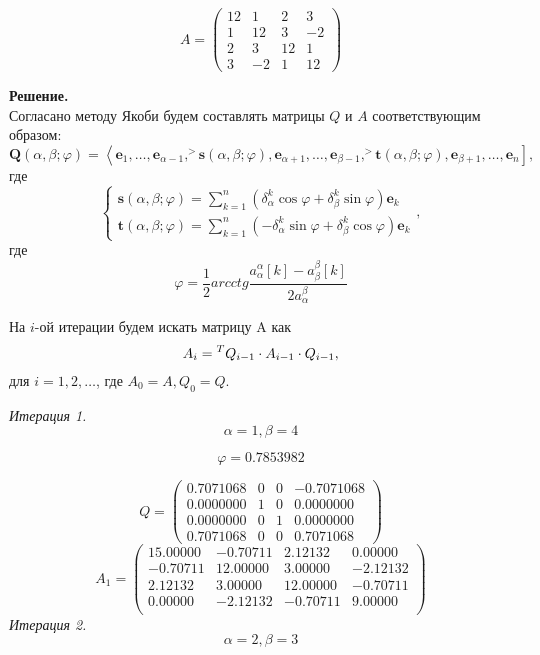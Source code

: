 \documentclass[14pt,a4paper]{scrartcl}
\begin{document}
$$ A =
\begin{pmatrix}
	12 & 1  & 2  & 3  \\
	1  & 12 & 3  & -2 \\
	2  & 3  & 12 & 1  \\
	3  & -2  & 1  & 12
\end{pmatrix}
$$

\textbf{Решение.}\\
Согласано методу Якоби будем составлять матрицы $Q$ и $A$ соответствующим образом:
\begin{equation*}
	\boldsymbol{Q}(\alpha, \beta ; \varphi)=\left\langle\boldsymbol{e}_{1}, \ldots, \boldsymbol{e}_{\alpha-1},^{>} \boldsymbol{s}(\alpha, \beta ; \varphi), \boldsymbol{e}_{\alpha+1}, \ldots, \boldsymbol{e}_{\beta-1},^{>} \boldsymbol{t}(\alpha, \beta ; \varphi), \boldsymbol{e}_{\beta+1}, \ldots, \boldsymbol{e}_{n}\right],
\end{equation*}
где
\begin{equation*}
	\left\{\begin{array}{l}{\boldsymbol{s}(\alpha, \beta ; \varphi)=\sum_{k=1}^{n}\left(\delta_{\alpha}^{k} \cos \varphi+\delta_{\beta}^{k} \sin \varphi\right) \boldsymbol{e}_{k}} \\ {\boldsymbol{t}(\alpha, \beta ; \varphi)=\sum_{k=1}^{n}\left(-\delta_{\alpha}^{k} \sin \varphi+\delta_{\beta}^{k} \cos \varphi\right) \boldsymbol{e}_{k}}\end{array}\right.,
\end{equation*}
где
\begin{equation*}
	\varphi = \frac{1}{2} arcctg \frac{a_\alpha^\alpha[k] - a_\beta^\beta[k]}{2a_\alpha^\beta}
\end{equation*}

На $i$-ой итерации будем искать матрицу A как
\begin{equation*}
	A_i = \prescript{T}{}{Q_{i-1}} \cdot A_{i-1} \cdot Q_{i-1},
\end{equation*}
для $i={1,2,\ldots}$, где $A_0 = A, Q_0 = Q$.

\textit{Итерация 1.}\\
$$\alpha = 1, \beta = 4$$

$$\varphi = 0.7853982 $$

$$ Q =
\begin{pmatrix}
0.7071068 & 0 & 0 & -0.7071068 \\
0.0000000 & 1 & 0 & 0.0000000  \\
0.0000000 & 0 & 1 & 0.0000000  \\
0.7071068 & 0 & 0 & 0.7071068 
\end{pmatrix}
$$
$$
A_1 = 
\begin{pmatrix}
15.00000 & -0.70711 & 2.12132 & 0.00000 \\ 
-0.70711 & 12.00000 & 3.00000 & -2.12132 \\ 
2.12132 & 3.00000 & 12.00000 & -0.70711 \\ 
0.00000 & -2.12132 & -0.70711 & 9.00000 \\ 
\end{pmatrix}
$$
\textit{Итерация 2.}\\
$$\alpha = 2, \beta = 3$$
\end{document}
